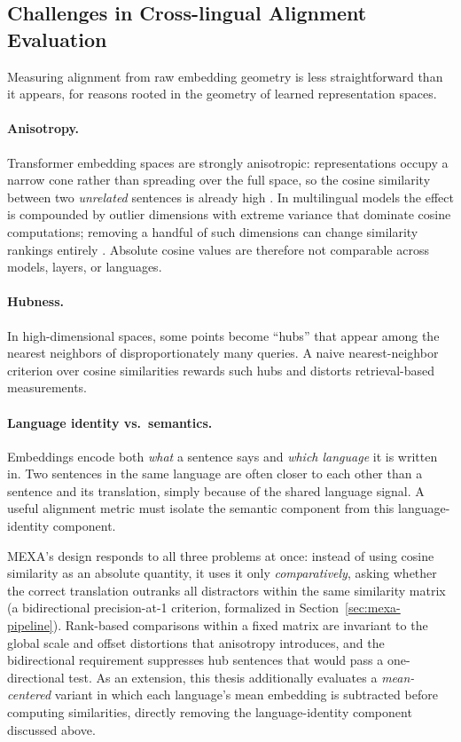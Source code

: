 \subsection{Challenges in Cross-lingual Alignment Evaluation}
\label{subsec:alignment-challenges}

Measuring alignment from raw embedding geometry is less straightforward
than it appears, for reasons rooted in the geometry of learned
representation spaces.

\paragraph{Anisotropy.} Transformer embedding spaces are strongly
anisotropic: representations occupy a narrow cone rather than spreading
over the full space, so the cosine similarity between two \emph{unrelated}
sentences is already high \citep{rajaee2022isotropy}. In multilingual
models the effect is compounded by outlier dimensions with extreme
variance that dominate cosine computations; removing a handful of such
dimensions can change similarity rankings entirely
\citep{hammerl2023anisotropy}. Absolute cosine values are therefore not
comparable across models, layers, or languages.

\paragraph{Hubness.} In high-dimensional spaces, some points become
``hubs'' that appear among the nearest neighbors of disproportionately
many queries. A naive nearest-neighbor criterion over cosine similarities
rewards such hubs and distorts retrieval-based measurements.

\paragraph{Language identity vs.\ semantics.} Embeddings encode both
\emph{what} a sentence says and \emph{which language} it is written in.
Two sentences in the same language are often closer to each other than a
sentence and its translation, simply because of the shared language
signal. A useful alignment metric must isolate the semantic component
from this language-identity component.

MEXA's design responds to all three problems at once: instead of using
cosine similarity as an absolute quantity, it uses it only
\emph{comparatively}, asking whether the correct translation outranks all
distractors within the same similarity matrix (a bidirectional
precision-at-1 criterion, formalized in
Section~\ref{sec:mexa-pipeline}). Rank-based comparisons within a fixed
matrix are invariant to the global scale and offset distortions that
anisotropy introduces, and the bidirectional requirement suppresses hub
sentences that would pass a one-directional test. As an extension, this
thesis additionally evaluates a \emph{mean-centered} variant in which each
language's mean embedding is subtracted before computing similarities,
directly removing the language-identity component discussed above.

